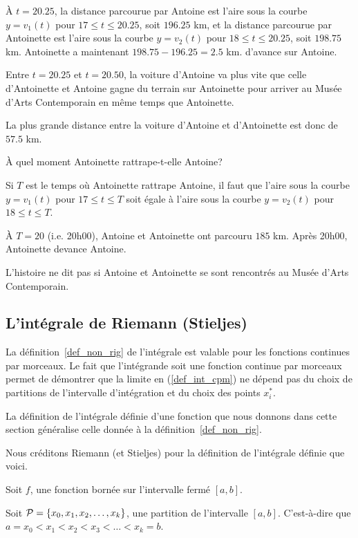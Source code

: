 {\begin{egg}
À $t=20.25$, la distance parcourue par Antoine est l'aire sous
la courbe $y=v_1(t)$ pour $17\leq t \leq 20.25$, soit $196.25$ km, et
la distance parcourue par Antoinette est l'aire sous la courbe
$y=v_2(t)$ pour $18\leq t \leq 20.25$, soit $198.75$ km.
Antoinette a maintenant $198.75-196.25= 2.5$ km. d'avance sur
Antoine.

Entre $t=20.25$ et $t=20.50$, la voiture d'Antoine va plus vite que
celle d'Antoinette et Antoine gagne du terrain sur Antoinette pour
arriver au Musée d'Arts Contemporain en même temps que Antoinette.

La plus grande distance entre la voiture d'Antoine et d'Antoinette est
donc de $57.5$ km.

 À quel moment Antoinette rattrape-t-elle Antoine?

Si $T$ est le temps où Antoinette rattrape Antoine, il faut que l'aire
sous la courbe $y=v_1(t)$ pour $17\leq t \leq T$ soit égale à l'aire
sous la courbe $y=v_2(t)$ pour $18\leq t \leq T$.

À $T = 20$ (i.e. 20h00), Antoine et Antoinette ont parcouru $185$ km.
Après 20h00, Antoinette devance Antoine.

L'histoire ne dit pas si Antoine et Antoinette se sont rencontrés au
Musée d'Arts Contemporain.
\end{egg}

\subsection{L'intégrale de Riemann (Stieljes)
  \theory} \label{Riemann_int}

La définition~\ref{def_non_rig} de l'intégrale est valable pour les
fonctions continues par morceaux.  Le fait que l'intégrande soit une
fonction continue par morceaux permet de démontrer que la limite en
(\ref{def_int_cpm}) ne dépend pas du choix de partitions de
l'intervalle d'intégration et du choix des points $x_i^\ast$.

La définition de l'intégrale définie d'une fonction que nous donnons
dans cette section généralise celle donnée à la définition~\ref{def_non_rig}.

Nous créditons Riemann (et Stieljes) pour la définition de l'intégrale
définie que voici.

Soit $f$, une fonction bornée sur l'intervalle fermé $[a,b]$.

Soit ${\cal P} = \{x_0, x_1, x_2, \ldots, x_k\}$, une partition de
l'intervalle $[a,b]$.  C'est-à-dire que
$a=x_0 < x_1 < x_2 < x_3 < \ldots < x_k = b$.

}
